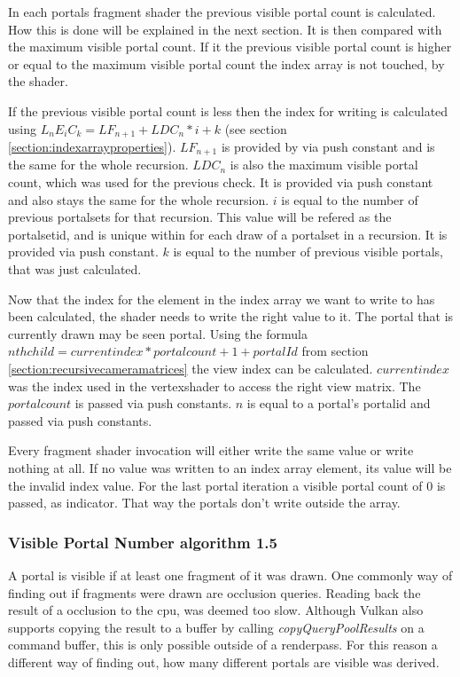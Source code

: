 In each portals fragment shader the previous visible portal count is calculated. How this is done will be explained in the next section. It is then compared with the maximum visible portal count. If it the previous visible portal count is higher or equal to the maximum visible portal count the index array is not touched, by the shader.

If the previous visible portal count is less then the index for writing is calculated using $L_nE_iC_k = LF_{n+1} + LDC_{n} * i + k$ (see section \ref{section:indexarrayproperties}). $LF_{n+1}$ is provided by via push constant and is the same for the whole recursion.  $LDC_{n}$ is also the maximum visible portal count, which was used for the previous check. It is provided via push constant and also stays the same for the whole recursion. $i$ is equal to the number of previous \glspl{portalset} for that recursion. This value will be refered as the \gls{portalsetid}, and is unique within for each draw of a \gls{portalset} in a recursion. It is provided via push constant. $k$ is equal to the number of previous visible portals, that was just calculated.

Now that the index for the element in the index array we want to write to has been calculated, the shader needs to write the right value to it. The portal that is currently drawn may be seen portal. Using the formula  $ nth child = current index * portalcount + 1 + portalId$ from section \ref{section:recursivecameramatrices} the view index can be calculated.  $currentindex$ was the index used in the vertexshader to access the right view matrix. The $portalcount$ is passed via push constants. $n$ is equal to a portal's \gls{portalid} and passed via push constants.

Every fragment shader invocation will either write the same value or write nothing at all. If no value was written to an index array element, its value will be the invalid index value. For the last portal iteration a visible portal count of 0 is passed, as indicator. That way the portals don't write outside the array.

\subsubsection{Visible Portal Number algorithm 1.5}
\label{section:visibleportalcount}
A portal is visible if at least one fragment of it was drawn. One commonly way of finding out if fragments were drawn are occlusion queries. Reading back the result of a occlusion to the \gls{cpu}, was deemed too slow. Although Vulkan also supports copying the result to a buffer by calling \textit{copyQueryPoolResults} on a command buffer, this is only possible outside of a renderpass. For this reason a different way of finding out, how many different portals are visible was derived.

